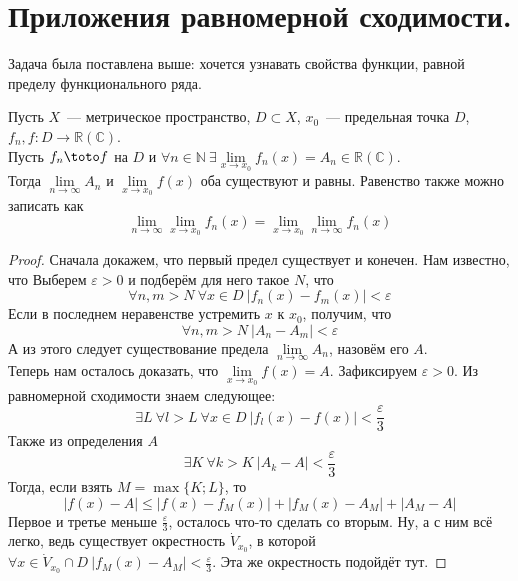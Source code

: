 \documentclass{article}
\let\eps\varepsilon
\begin{document}
    \section{Приложения равномерной сходимости.}
    \begin{remark}
        Задача была поставлена выше: хочется узнавать свойства функции, равной пределу функционального ряда.
    \end{remark}
    \begin{theorem}
        \label{Перестановка пределов}
        Пусть $X$~--- метрическое пространство, $D\subset X$, $x_0$~--- предельная точка $D$, $f_n,f\colon D\to\mathbb R(\mathbb C)$.\\
        Пусть $f_n\toto f$ на $D$ и $\forall n\in\mathbb N~\exists\lim\limits_{x\to x_0}f_n(x)=A_n\in\mathbb R(\mathbb C)$.\\
        Тогда $\lim\limits_{n\to\infty}A_n$ и $\lim\limits_{x\to x_0}f(x)$ оба существуют и равны. Равенство также можно записать как
        $$
        \lim\limits_{n\to\infty}\lim\limits_{x\to x_0}f_n(x)=\lim\limits_{x\to x_0}\lim\limits_{n\to\infty}f_n(x)
        $$
    \end{theorem}
    \begin{proof}
        Сначала докажем, что первый предел существует и конечен. Нам известно, что
        Выберем $\eps>0$ и подберём для него такое $N$, что
        $$
        \forall n,m>N~\forall x\in D~|f_n(x)-f_m(x)|<\eps
        $$
        Если в последнем неравенстве устремить $x$ к $x_0$, получим, что 
        $$
        \forall n,m>N~|A_n-A_m|<\eps
        $$
        А из этого следует существование предела $\lim\limits_{n\to\infty}A_n$, назовём его $A$.\\
        Теперь нам осталось доказать, что $\lim\limits_{x\to x_0}f(x)=A$. Зафиксируем $\eps>0$. Из равномерной сходимости знаем следующее:
        $$
        \exists L~\forall l>L~\forall x\in D~|f_l(x)-f(x)|<\frac\eps3
        $$
        Также из определения $A$
        $$
        \exists K~\forall k>K~|A_k-A|<\frac\eps3
        $$
        Тогда, если взять $M=\max\{K;L\}$, то
        $$
        |f(x)-A|\leqslant|f(x)-f_M(x)|+|f_M(x)-A_M|+|A_M-A|
        $$
        Первое и третье меньше $\frac\eps3$, осталось что-то сделать со вторым. Ну, а с ним всё легко, ведь существует окрестность $\dot{V}_{x_0}$, в которой $\forall x\in \dot{V}_{x_0}\cap D~|f_M(x)-A_M|<\frac\eps3$. Эта же окрестность подойдёт тут.
    \end{proof}
\end{document}

